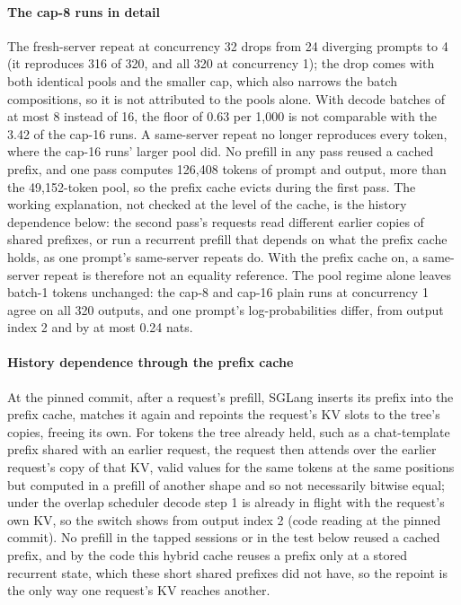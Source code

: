 \paragraph{The cap-8 runs in detail} The fresh-server repeat at concurrency 32 drops from 24 diverging prompts to 4 (it reproduces 316 of 320, and all 320 at concurrency 1); the drop comes with both identical pools and the smaller cap, which also narrows the batch compositions, so it is not attributed to the pools alone. With decode batches of at most 8 instead of 16, the floor of 0.63 per 1,000 is not comparable with the 3.42 of the cap-16 runs. A same-server repeat no longer reproduces every token, where the cap-16 runs' larger pool did. No prefill in any pass reused a cached prefix, and one pass computes 126,408 tokens of prompt and output, more than the 49,152-token pool, so the prefix cache evicts during the first pass. The working explanation, not checked at the level of the cache, is the history dependence below: the second pass's requests read different earlier copies of shared prefixes, or run a recurrent prefill that depends on what the prefix cache holds, as one prompt's same-server repeats do. With the prefix cache on, a same-server repeat is therefore not an equality reference. The pool regime alone leaves batch-1 tokens unchanged: the cap-8 and cap-16 plain runs at concurrency 1 agree on all 320 outputs, and one prompt's log-probabilities differ, from output index 2 and by at most 0.24 nats.

\paragraph{History dependence through the prefix cache} At the pinned commit, after a request's prefill, SGLang inserts its prefix into the prefix cache, matches it again and repoints the request's KV slots to the tree's copies, freeing its own. For tokens the tree already held, such as a chat-template prefix shared with an earlier request, the request then attends over the earlier request's copy of that KV, valid values for the same tokens at the same positions but computed in a prefill of another shape and so not necessarily bitwise equal; under the overlap scheduler decode step 1 is already in flight with the request's own KV, so the switch shows from output index 2 (code reading at the pinned commit). No prefill in the tapped sessions or in the test below reused a cached prefix, and by the code this hybrid cache reuses a prefix only at a stored recurrent state, which these short shared prefixes did not have, so the repoint is the only way one request's KV reaches another.


